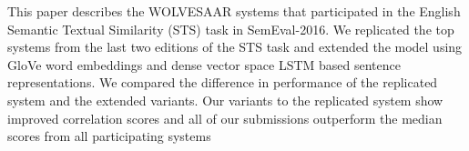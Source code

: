 This paper describes the WOLVESAAR systems that participated in the English Semantic Textual Similarity (STS) task in SemEval-2016. We replicated the top systems from the last two editions of the STS task and extended the model using GloVe word embeddings and dense vector space LSTM based sentence representations. We compared the difference in performance of the replicated system and the extended variants. Our variants to the replicated system show improved correlation scores and all of our submissions outperform the median scores from all participating systems

